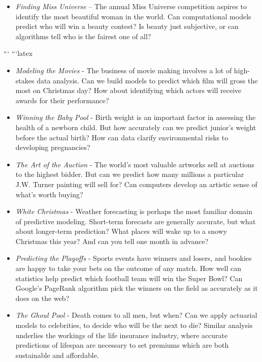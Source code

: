 \documentclass[10pt]{article}
\begin{document}
\begin{itemize}
  \item \textit{Finding Miss Universe} – The annual Miss Universe competition aspires to identify the most beautiful woman in the world. Can computational models predict who will win a beauty contest? Is beauty just subjective, or can algorithms tell who is the fairest one of all?
\end{itemize}
```
```latex
\begin{itemize}
    \item \textit{Modeling the Movies} - The business of movie making involves a lot of high-stakes data analysis. Can we build models to predict which film will gross the most on Christmas day? How about identifying which actors will receive awards for their performance?
    \item \textit{Winning the Baby Pool} - Birth weight is an important factor in assessing the health of a newborn child. But how accurately can we predict junior's weight before the actual birth? How can data clarify environmental risks to developing pregnancies?
    \item \textit{The Art of the Auction} - The world's most valuable artworks sell at auctions to the highest bidder. But can we predict how many millions a particular J.W. Turner painting will sell for? Can computers develop an artistic sense of what's worth buying?
    \item \textit{White Christmas} - Weather forecasting is perhaps the most familiar domain of predictive modeling. Short-term forecasts are generally accurate, but what about longer-term prediction? What places will wake up to a snowy Christmas this year? And can you tell one month in advance?
    \item \textit{Predicting the Playoffs} - Sports events have winners and losers, and bookies are happy to take your bets on the outcome of any match. How well can statistics help predict which football team will win the Super Bowl? Can Google's PageRank algorithm pick the winners on the field as accurately as it does on the web?
    \item \textit{The Ghoul Pool} - Death comes to all men, but when? Can we apply actuarial models to celebrities, to decide who will be the next to die? Similar analysis underlies the workings of the life insurance industry, where accurate predictions of lifespan are necessary to set premiums which are both sustainable and affordable.
\end{itemize}
\end{document}
